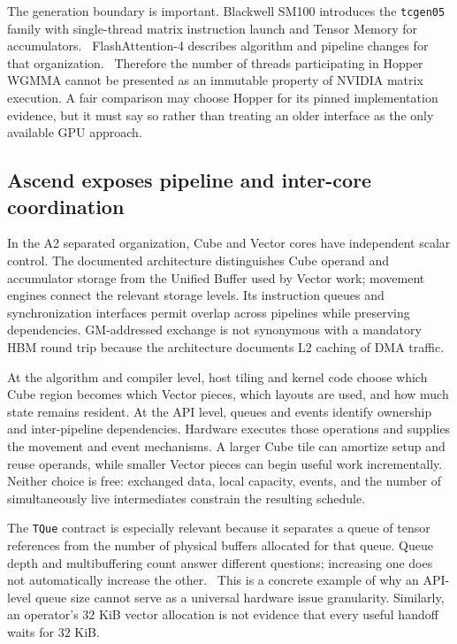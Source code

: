 The generation boundary is important. Blackwell SM100 introduces the \texttt{tcgen05} family with single-thread matrix instruction launch and Tensor Memory for accumulators.~\citep{u001-tcgen05} FlashAttention-4 describes algorithm and pipeline changes for that organization.~\citep{u001-fa4} Therefore the number of threads participating in Hopper WGMMA cannot be presented as an immutable property of NVIDIA matrix execution. A fair comparison may choose Hopper for its pinned implementation evidence, but it must say so rather than treating an older interface as the only available GPU approach.

\subsection{Ascend exposes pipeline and inter-core coordination}

In the A2 separated organization, Cube and Vector cores have independent scalar control. The documented architecture distinguishes Cube operand and accumulator storage from the Unified Buffer used by Vector work; movement engines connect the relevant storage levels. Its instruction queues and synchronization interfaces permit overlap across pipelines while preserving dependencies. GM-addressed exchange is not synonymous with a mandatory HBM round trip because the architecture documents L2 caching of DMA traffic.~\citep{u001-ascend-basic}

At the algorithm and compiler level, host tiling and kernel code choose which Cube region becomes which Vector pieces, which layouts are used, and how much state remains resident. At the API level, queues and events identify ownership and inter-pipeline dependencies. Hardware executes those operations and supplies the movement and event mechanisms. A larger Cube tile can amortize setup and reuse operands, while smaller Vector pieces can begin useful work incrementally. Neither choice is free: exchanged data, local capacity, events, and the number of simultaneously live intermediates constrain the resulting schedule.

The \texttt{TQue} contract is especially relevant because it separates a queue of tensor references from the number of physical buffers allocated for that queue. Queue depth and multibuffering count answer different questions; increasing one does not automatically increase the other.~\citep{u002-ascend-tque} This is a concrete example of why an API-level queue size cannot serve as a universal hardware issue granularity. Similarly, an operator's $32$ KiB vector allocation is not evidence that every useful handoff waits for $32$ KiB.

